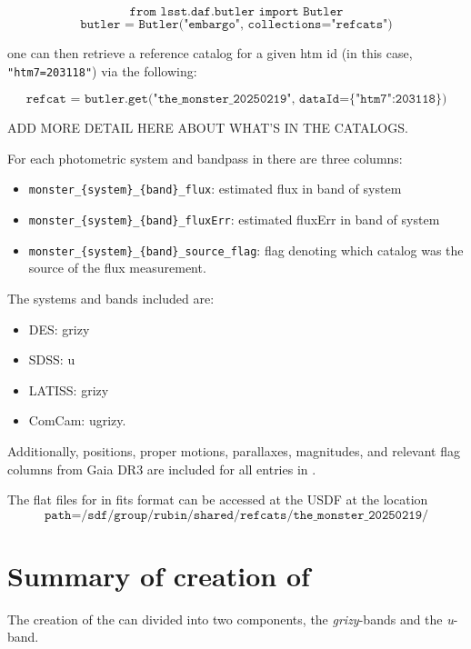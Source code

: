 $$\texttt{from lsst.daf.butler import Butler}$$
$$\texttt{butler = Butler("embargo", collections="refcats")}$$

one can then retrieve a reference catalog for a given htm id (in this case, \texttt{"htm7=203118"}) via the following:

$$\texttt{refcat = butler.get("the\_monster\_20250219", dataId=\{"htm7":203118\})}$$

ADD MORE DETAIL HERE ABOUT WHAT'S IN THE CATALOGS.

For each photometric system and bandpass in \monster there are three columns:
\begin{itemize}
    \item \texttt{monster\_\{system\}\_\{band\}\_flux}: estimated flux in band of system
    \item \texttt{monster\_\{system\}\_\{band\}\_fluxErr}: estimated fluxErr in band of system
    \item \texttt{monster\_\{system\}\_\{band\}\_source\_flag}: flag denoting which catalog was the source of the flux measurement.
\end{itemize}

The systems and bands included are:
\begin{itemize}
    \item DES: grizy
    \item SDSS: u
    \item LATISS: grizy
    \item ComCam: ugrizy.
\end{itemize}

Additionally, positions, proper motions, parallaxes, magnitudes, and relevant flag columns from Gaia DR3 are included for all entries in \monster.

The flat files for \monster in fits format can be accessed at the USDF at the location
$$\texttt{path=/sdf/group/rubin/shared/refcats/the\_monster\_20250219/}$$


\section{Summary of creation of \monster}
\label{sec:summary}
The creation of the \monster can divided into two components, the \textit{grizy}-bands and the \textit{u}-band.



